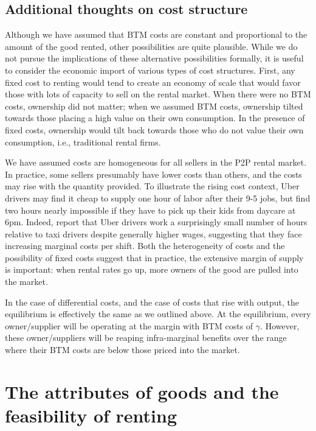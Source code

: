 \documentclass[11pt]{article}
\begin{document}
\subsection{Additional thoughts on cost structure}

Although we have assumed that BTM costs are constant and proportional to the amount of the good rented, other possibilities are quite plausible.
While we do not pursue the implications of these alternative possibilities formally, it is useful to consider the economic import of various types of cost structures.
First, any fixed cost to renting would tend to create an economy of scale that would favor those with lots of capacity to sell on the rental market.
When there were no BTM costs, ownership did not matter;
when we assumed BTM costs, ownership tilted towards those placing a high value on their own consumption.
In the presence of fixed costs, ownership would tilt back towards those who do not value their own consumption, i.e., traditional rental firms. 

We have assumed costs are homogeneous for all sellers in the P2P rental market.
In practice, some sellers presumably have lower costs than others, and the costs may rise with the quantity provided. 
To illustrate the rising cost context, Uber drivers may find it cheap to supply one hour of labor after their 9-5 jobs, but find two hours nearly impossible if they have to pick up their kids from daycare at 6pm.  
Indeed, \cite{hall2015analysis} report that Uber drivers work a surprisingly small number of hours relative to taxi drivers despite generally higher wages, suggesting that they face increasing marginal costs per shift. 
Both the heterogeneity of costs and the possibility of fixed costs suggest that in practice, the extensive margin of supply is important:
when rental rates go up, more owners of the good are pulled into the market. 

In the case of differential costs, and the case of costs that rise with output, the equilibrium is effectively the same as we outlined above.
At the equilibrium, every owner/supplier will be operating at the margin with BTM costs of $\gamma$.
However, these owner/suppliers will be reaping infra-marginal benefits over the range where their BTM costs are below those priced into the market. 

\section{The attributes of goods and the feasibility of renting} \label{sec:empirics} 
\end{document}

